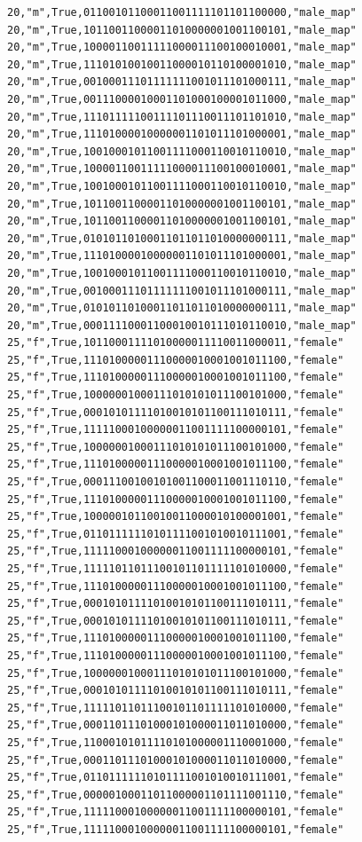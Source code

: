 \documentclass[authoryearcitations]{UoYCSproject}
\begin{document}
\begin{framed}
\begin{verbatim}
20,"m",True,01100101100011001111101101100000,"male_map"
20,"m",True,10110011000011010000001001100101,"male_map"
20,"m",True,10000110011111000011100100010001,"male_map"
20,"m",True,11101010010011000010110100001010,"male_map"
20,"m",True,00100011101111111001011101000111,"male_map"
20,"m",True,00111000010001101000100001011000,"male_map"
20,"m",True,11101111100111101110011101101010,"male_map"
20,"m",True,11101000010000001101011101000001,"male_map"
20,"m",True,10010001011001111000110010110010,"male_map"
20,"m",True,10000110011111000011100100010001,"male_map"
20,"m",True,10010001011001111000110010110010,"male_map"
20,"m",True,10110011000011010000001001100101,"male_map"
20,"m",True,10110011000011010000001001100101,"male_map"
20,"m",True,01010110100011011011010000000111,"male_map"
20,"m",True,11101000010000001101011101000001,"male_map"
20,"m",True,10010001011001111000110010110010,"male_map"
20,"m",True,00100011101111111001011101000111,"male_map"
20,"m",True,01010110100011011011010000000111,"male_map"
20,"m",True,00011110001100010010111010110010,"male_map"
25,"f",True,10110001111010000011110011000011,"female"
25,"f",True,11101000001110000010001001011100,"female"
25,"f",True,11101000001110000010001001011100,"female"
25,"f",True,10000001000111010101011100101000,"female"
25,"f",True,00010101111010010101100111010111,"female"
25,"f",True,11111000100000011001111100000101,"female"
25,"f",True,10000001000111010101011100101000,"female"
25,"f",True,11101000001110000010001001011100,"female"
25,"f",True,00011100100101001100011001110110,"female"
25,"f",True,11101000001110000010001001011100,"female"
25,"f",True,10000010110010011000010100001001,"female"
25,"f",True,01101111110101111001010010111001,"female"
25,"f",True,11111000100000011001111100000101,"female"
25,"f",True,11111011011100101101111101010000,"female"
25,"f",True,11101000001110000010001001011100,"female"
25,"f",True,00010101111010010101100111010111,"female"
25,"f",True,00010101111010010101100111010111,"female"
25,"f",True,11101000001110000010001001011100,"female"
25,"f",True,11101000001110000010001001011100,"female"
25,"f",True,10000001000111010101011100101000,"female"
25,"f",True,00010101111010010101100111010111,"female"
25,"f",True,11111011011100101101111101010000,"female"
25,"f",True,00011011101000101000011011010000,"female"
25,"f",True,11000101011110101000001110001000,"female"
25,"f",True,00011011101000101000011011010000,"female"
25,"f",True,01101111110101111001010010111001,"female"
25,"f",True,00000100011011000001101111001110,"female"
25,"f",True,11111000100000011001111100000101,"female"
25,"f",True,11111000100000011001111100000101,"female"

\end{verbatim}
\end{framed}
\end{document}
